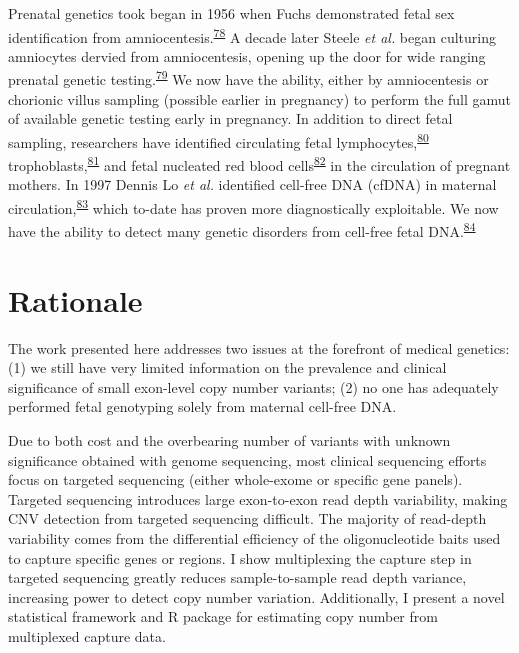 \documentclass[11pt,letterpaper]{book}
\begin{document}
Prenatal genetics took began in 1956 when Fuchs demonstrated fetal sex identification from amniocentesis.\textsuperscript{\protect\hyperlink{ref-fuchs:1956aa}{78}}
A decade later Steele \emph{et al.} began culturing amniocytes dervied from amniocentesis, opening up the door for wide ranging prenatal genetic testing.\textsuperscript{\protect\hyperlink{ref-steele:1966aa}{79}}
We now have the ability, either by amniocentesis or chorionic villus sampling (possible earlier in pregnancy) to perform the full gamut of available genetic testing early in pregnancy.
In addition to direct fetal sampling, researchers have identified circulating fetal lymphocytes,\textsuperscript{\protect\hyperlink{ref-walknowska:1969aa}{80}} trophoblasts,\textsuperscript{\protect\hyperlink{ref-mueller:1990aa}{81}} and fetal nucleated red blood cells\textsuperscript{\protect\hyperlink{ref-bianchi:1990aa}{82}} in the circulation of pregnant mothers.
In 1997 Dennis Lo \emph{et al.} identified cell-free DNA (cfDNA) in maternal circulation,\textsuperscript{\protect\hyperlink{ref-lo:1997aa}{83}} which to-date has proven more diagnostically exploitable.
We now have the ability to detect many genetic disorders from cell-free fetal DNA.\textsuperscript{\protect\hyperlink{ref-scotchman:2020aa}{84}}

\hypertarget{prob}{%
\section{Rationale}\label{prob}}

The work presented here addresses two issues at the forefront of medical genetics: (1) we still have very limited information on the prevalence and clinical significance of small exon-level copy number variants; (2) no one has adequately performed fetal genotyping solely from maternal cell-free DNA.

Due to both cost and the overbearing number of variants with unknown significance obtained with genome sequencing, most clinical sequencing efforts focus on targeted sequencing (either whole-exome or specific gene panels).
Targeted sequencing introduces large exon-to-exon read depth variability, making CNV detection from targeted sequencing difficult.
The majority of read-depth variability comes from the differential efficiency of the oligonucleotide baits used to capture specific genes or regions.
I show multiplexing the capture step in targeted sequencing greatly reduces sample-to-sample read depth variance, increasing power to detect copy number variation.
Additionally, I present a novel statistical framework and R package for estimating copy number from multiplexed capture data.
\end{document}
